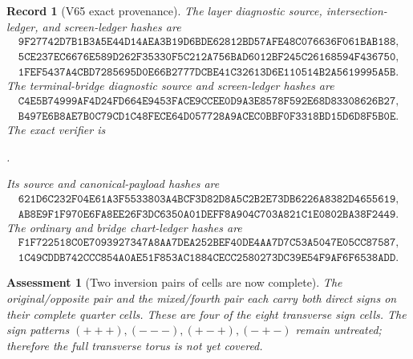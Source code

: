 \documentclass[11pt,oneside]{article}
\newtheorem{assessment}[theorem]{Assessment}
\newtheorem{record}[theorem]{Record}
\theoremstyle{definition}
\theoremstyle{remark}
\begin{document}
\begin{record}[V65 exact provenance]
\label{rec:newv65-provenance}
The layer diagnostic source, intersection-ledger, and screen-ledger
hashes are
\[
\begin{gathered}
\texttt{9F27742D7B1B3A5E44D14AEA3B19D6BDE62812BD57AFE48C076636F061BAB188},\\
\texttt{5CE237EC6676E589D262F35330F5C212A756BAD6012BF245C26168594F436750},\\
\texttt{1FEF5437A4CBD7285695D0E66B2777DCBE41C32613D6E110514B2A5619995A5B}.
\end{gathered}                                        \tag{65.17}
\]
The terminal-bridge diagnostic source and screen-ledger hashes are
\[
\begin{gathered}
\texttt{C4E5B74999AF4D24FD664E9453FACE9CCEE0D9A3E8578F592E68D83308626B27},\\
\texttt{B497E6B8AE7B0C79CD1C48FECE64D057728A9ACEC0BBF0F3318BD15D6D8F5B0E}.
\end{gathered}                                        \tag{65.18}
\]
The exact verifier is
\begin{center}
\footnotesize
{}.
\end{center}
Its source and canonical-payload hashes are
\[
\begin{gathered}
\texttt{621D6C232F04E61A3F5533803A4BCF3D82D8A5C2B2E73DB6226A8382D4655619},\\
\texttt{AB8E9F1F970E6FA8EE26F3DC6350A01DEFF8A904C703A821C1E0802BA38F2449}.
\end{gathered}                                        \tag{65.19}
\]
The ordinary and bridge chart-ledger hashes are
\[
\begin{gathered}
\texttt{F1F722518C0E7093927347A8AA7DEA252BEF40DE4AA7D7C53A5047E05CC87587},\\
\texttt{1C49CDDB742CCC854A0AE51F853AC1884CECC2580273DC39E54F9AF6F6538ADD}.
\end{gathered}                                        \tag{65.20}
\]
\end{record}

\begin{assessment}[Two inversion pairs of cells are now complete]
\label{ass:newv65}
The original/opposite pair and the mixed/fourth pair each carry both
direct signs on their complete quarter cells.  These are four of
the eight transverse sign cells.  The sign patterns
\((+++),(---),(+-+),(-+-)\) remain untreated; therefore the full
transverse torus is not yet covered.
\end{assessment}
\end{document}
